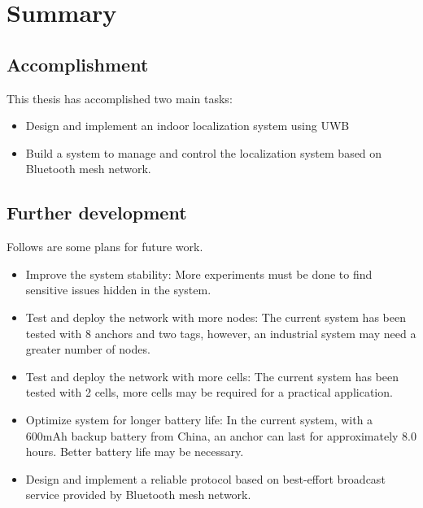 \documentclass[\main/main.tex]{subfiles}
\begin{document}
\graphicspath{{img/}{summary/img/}}

\chapter{Summary}

\section{Accomplishment}
This thesis has accomplished two main tasks:
\begin{itemize}
    \item Design and implement an indoor localization system using UWB
    \item Build a system to manage and control the localization system based on Bluetooth mesh network.
\end{itemize}

\section{Further development}
Follows are some plans for future work.
\begin{itemize}
    \item Improve the system stability: More experiments must be done to find sensitive issues hidden in the system.
    \item Test and deploy the network with more nodes: The current system has been tested with 8 anchors and two tags, however, an industrial system may need a greater number of nodes.
    \item Test and deploy the network with more cells: The current system has been tested with 2 cells, more cells may be required for a practical application.
    \item Optimize system for longer battery life: In the current system, with a 600mAh backup battery from China, an anchor can last for approximately 8.0 hours. Better battery life may be necessary.
    \item Design and implement a reliable protocol based on best-effort broadcast service provided by Bluetooth mesh network.
\end{itemize}
\end{document}
